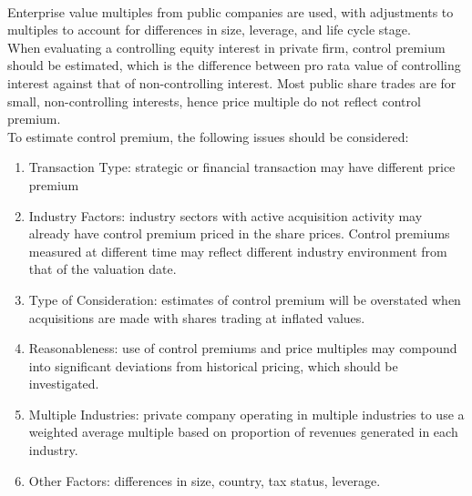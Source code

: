 \begin{method} \\
Enterprise value multiples from public companies are used, with adjustments to multiples to account for differences in size, leverage, and life cycle stage.\\
When evaluating a controlling equity interest in private firm, control premium should be estimated, which is the difference between pro rata value of controlling interest against that of non-controlling interest. Most public share trades are for small, non-controlling interests, hence price multiple do not reflect control premium.\\
To estimate control premium, the following issues should be considered:
\begin{enumerate}[label=\roman*.]
\setlength{\itemsep}{0pt}
\item Transaction Type: strategic or financial transaction may have different price premium
\item Industry Factors: industry sectors with active acquisition activity may already have control premium priced in the share prices. Control premiums measured at different time may reflect different industry environment from that of the valuation date.
\item Type of Consideration: estimates of control premium will be overstated when acquisitions are made with shares trading at inflated values.
\item Reasonableness: use of control premiums and price multiples may compound into significant deviations from historical pricing, which should be investigated.
\item Multiple Industries: private company operating in multiple industries to use a weighted average multiple based on proportion of revenues generated in each industry.
\item Other Factors: differences in size, country, tax status, leverage.
\end{enumerate}
\end{method}

